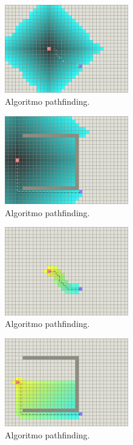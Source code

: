 \documentclass[reprint,amsmath,amssymb,aps]{revtex4-2}
\begin{document}
 \begin{figure}[H]
 	\centering
 	\includegraphics[width=0.48\textwidth]{dijkstra.png}
 	\caption{Algoritmo pathfinding.}
 	\label{dijkstra}
 \end{figure}
 
  \begin{figure}[H]
 	\centering
 	\includegraphics[width=0.48\textwidth]{dijkstra-trap.png}
 	\caption{Algoritmo pathfinding.}
 	\label{dijkstra-trap}
 \end{figure}
 
  \begin{figure}[H]
 	\centering
 	\includegraphics[width=0.48\textwidth]{a-star.png}
 	\caption{Algoritmo pathfinding.}
 	\label{a}
 \end{figure}
 
   \begin{figure}[H]
 	\centering
 	\includegraphics[width=0.48\textwidth]{a-star-trap.png}
 	\caption{Algoritmo pathfinding.}
 	\label{a-trap}
 \end{figure}
\end{document}
